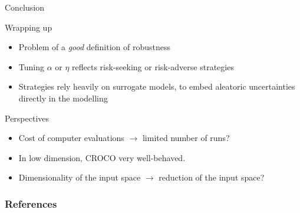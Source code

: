 \documentclass[10pt,aspectratio=169]{beamer}
\begin{document}
\begin{frame}[label=conclusion]{Conclusion}
  
  \begin{block}{Wrapping up}
    \begin{itemize}
    \item Problem of a \emph{good} definition of robustness
    \item Tuning $\alpha$ or $\eta$ reflects risk-seeking or
      risk-adverse strategies
    \item Strategies rely heavily on surrogate models, to embed
      aleatoric uncertainties directly in the modelling
    \end{itemize}
  \end{block}


  \begin{block}{Perspectives}
    \begin{itemize}
    \item Cost of computer evaluations $\rightarrow$ limited number of
      runs?
    \item In low dimension, CROCO very well-behaved.
    \item Dimensionality of the input space $\rightarrow$ reduction of
      the input space?
    \end{itemize}
  \end{block}
\end{frame}


\begin{frame}[allowframebreaks]
  \frametitle{References} 
  
\end{frame}

\appendix
\end{document}
